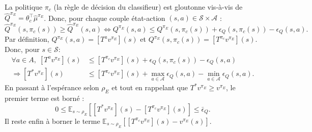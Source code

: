 \documentclass[french,utf8]{./hermes-journal}
\newcommand{\s}{\mathcal{S}}
\newcommand{\A}{\mathcal{A}}
\newcommand{\E}{\mathbb{E}}
\begin{document}
\begin{proof*}
  La politique $\pi_c$ (la règle de décision du classifieur) est gloutonne vis-à-vis de 
  $\hat{Q}^{\pi_E}=\theta_c^\top\hat{\mu}^{\pi_E}$. Donc, pour chaque couple état-action
  $(s,a)\in\s\times \A$ :
  \begin{equation}
    \hat{Q}^{\pi_E}(s,\pi_c(s))\geq
    \hat{Q}^{\pi_E}(s,a)
    \Leftrightarrow
    Q^{\pi_E}(s,a) \leq Q^{\pi_E}(s,\pi_c(s)) +
    \epsilon_Q(s,\pi_c(s)) - \epsilon_Q(s,a).
  \end{equation}
  Par définition, $Q^{\pi_E}(s,a) = [T^a v^{\pi_E}](s)$ et
  $Q^{\pi_E}(s,\pi_c(s)) = [T^{\pi_c} v^{\pi_E}](s)$. Donc, pour $s\in\s$:
  \begin{align}
    \forall a\in A,\; [T^a v^{\pi_E}](s) &\leq [T^{\pi_c}
    v^{\pi_E}](s) + \epsilon_Q(s,\pi_c(s))-\epsilon_Q(s,a)
    \\
    \Rightarrow [T^* v^{\pi_E}](s) &\leq [T^{\pi_c}
    v^{\pi_E}](s) + \max_{a\in \A}\epsilon_Q(s,a)-\min_{a\in
    \A}\epsilon_Q(s,a).
  \end{align}
  En passant à l'espérance selon $\rho_E$ et tout en rappelant que 
  $T^* v^{\pi_E}\geq v^{\pi_E}$, le premier terme est borné :
  \begin{equation}
    0 \leq \E_{s\sim\rho_E}\left[ [T^* v^{\pi_E}](s) - [T^{\pi_c}
    v^{\pi_E}](s)\right] \leq \bar{\epsilon}_Q.
    \label{eroo1}
  \end{equation}
  Il reste enfin à borner le terme $\E_{s\sim\rho_E}[[T^{\pi_c}v^{\pi_E}](s) -
  v^{\pi_E}(s)]$.


\end{proof*}
\end{document}
